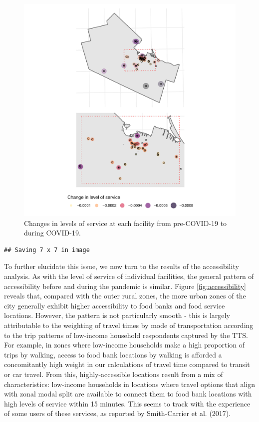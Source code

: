 \documentclass[]{elsarticle} %
\begin{document}
\begin{figure}
\includegraphics[width=1\linewidth]{Accessibility-Foodbanks-Hamilton_files/figure-latex/plot-levels-of-service-changes-1} \caption{\label{fig:levels-of-service-changes}Changes in levels of service at each facility from pre-COVID-19 to during COVID-19.}\label{fig:plot-levels-of-service-changes}
\end{figure}

\begin{verbatim}
## Saving 7 x 7 in image
\end{verbatim}

To further elucidate this issue, we now turn to the results of the
accessibility analysis. As with the level of service of individual
facilities, the general pattern of accessibility before and during the
pandemic is similar. Figure \ref{fig:accessibility} reveals that,
compared with the outer rural zones, the more urban zones of the city
generally exhibit higher accessibility to food banks and food service
locations. However, the pattern is not particularly smooth - this is
largely attributable to the weighting of travel times by mode of
transportation according to the trip patterns of low-income household
respondents captured by the TTS. For example, in zones where low-income
households make a high proportion of trips by walking, access to food
bank locations by walking is afforded a concomitantly high weight in our
calculations of travel time compared to transit or car travel. From
this, highly-accessible locations result from a mix of characteristics:
low-income households in locations where travel options that align with
zonal modal split are available to connect them to food bank locations
with high levels of service within 15 minutes. This seems to track with
the experience of some users of these services, as reported by
Smith-Carrier et al. (2017).
\end{document}
